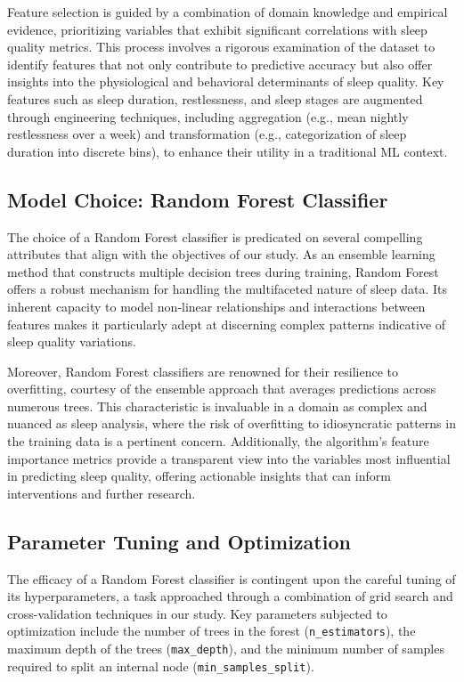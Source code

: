 \documentclass[10pt]{extarticle}
\begin{document}
Feature selection is guided by a combination of domain knowledge and empirical evidence, prioritizing variables that exhibit significant correlations with sleep quality metrics. This process involves a rigorous examination of the dataset to identify features that not only contribute to predictive accuracy but also offer insights into the physiological and behavioral determinants of sleep quality. Key features such as sleep duration, restlessness, and sleep stages are augmented through engineering techniques, including aggregation (e.g., mean nightly restlessness over a week) and transformation (e.g., categorization of sleep duration into discrete bins), to enhance their utility in a traditional ML context.

\subsection{Model Choice: Random Forest Classifier}

The choice of a Random Forest classifier is predicated on several compelling attributes that align with the objectives of our study. As an ensemble learning method that constructs multiple decision trees during training, Random Forest offers a robust mechanism for handling the multifaceted nature of sleep data. Its inherent capacity to model non-linear relationships and interactions between features makes it particularly adept at discerning complex patterns indicative of sleep quality variations.

Moreover, Random Forest classifiers are renowned for their resilience to overfitting, courtesy of the ensemble approach that averages predictions across numerous trees. This characteristic is invaluable in a domain as complex and nuanced as sleep analysis, where the risk of overfitting to idiosyncratic patterns in the training data is a pertinent concern. Additionally, the algorithm's feature importance metrics provide a transparent view into the variables most influential in predicting sleep quality, offering actionable insights that can inform interventions and further research.

\subsection{Parameter Tuning and Optimization}

The efficacy of a Random Forest classifier is contingent upon the careful tuning of its hyperparameters, a task approached through a combination of grid search and cross-validation techniques in our study. Key parameters subjected to optimization include the number of trees in the forest (\texttt{n\_estimators}), the maximum depth of the trees (\texttt{max\_depth}), and the minimum number of samples required to split an internal node (\texttt{min\_samples\_split}).
\end{document}
